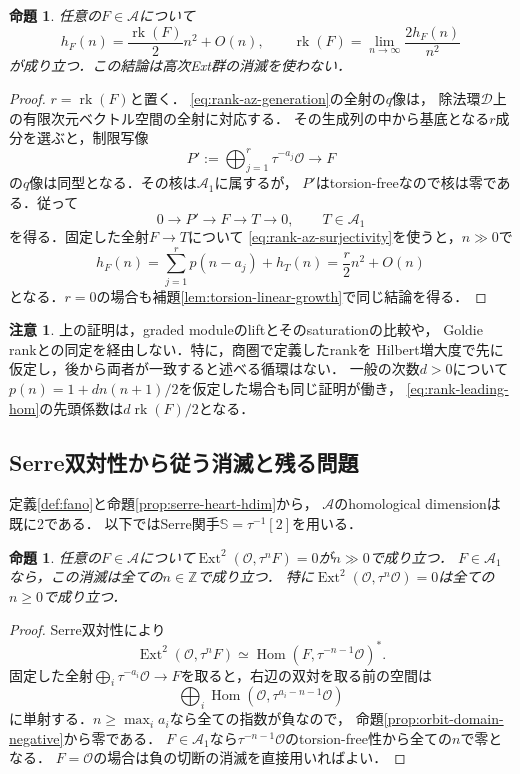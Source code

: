 \documentclass[11pt,a4paper]{ltjsarticle}
\newtheorem{proposition}[theorem]{命題}
\theoremstyle{definition}
\newtheorem{remark}[theorem]{注意}
\newcommand{\OO}{\mathcal O}
\renewcommand{\AA}{\mathcal A}
\newcommand{\SSer}{\mathbb S}
\newcommand{\Hom}{\operatorname{Hom}}
\newcommand{\Ext}{\operatorname{Ext}}
\newcommand{\rk}{\operatorname{rk}}
\begin{document}
\begin{proposition}\label{prop:rank-leading-hom}
任意の$F\in\AA$について
\begin{equation}\label{eq:rank-leading-hom}
 h_F(n)=\frac{\rk(F)}2 n^2+O(n),\qquad
 \rk(F)=\lim_{n\to\infty}\frac{2h_F(n)}{n^2}
\end{equation}
が成り立つ．この結論は高次Ext群の消滅を使わない．
\end{proposition}

\begin{proof}
$r=\rk(F)$と置く．
\eqref{eq:rank-az-generation}の全射の$q$像は，
除法環$\mathcal D$上の有限次元ベクトル空間の全射に対応する．
その生成列の中から基底となる$r$成分を選ぶと，制限写像
\[
 P':=\bigoplus_{j=1}^{r}\tau^{-a_j}\OO\longrightarrow F
\]
の$q$像は同型となる．その核は$\AA_1$に属するが，
$P'$はtorsion-freeなので核は零である．従って
\[
 0\longrightarrow P'\longrightarrow F\longrightarrow T\longrightarrow0,
 \qquad T\in\AA_1
\]
を得る．固定した全射$F\to T$について
\eqref{eq:rank-az-surjectivity}を使うと，$n\gg0$で
\[
 h_F(n)=\sum_{j=1}^{r}p(n-a_j)+h_T(n)
       =\frac r2n^2+O(n)
\]
となる．$r=0$の場合も補題\ref{lem:torsion-linear-growth}で同じ結論を得る．
\end{proof}

\begin{remark}
上の証明は，graded moduleのliftとそのsaturationの比較や，
Goldie rankとの同定を経由しない．特に，商圏で定義したrankを
Hilbert増大度で先に仮定し，後から両者が一致すると述べる循環はない．
一般の次数$d>0$について$p(n)=1+dn(n+1)/2$を仮定した場合も同じ証明が働き，
\eqref{eq:rank-leading-hom}の先頭係数は$d\rk(F)/2$となる．
\end{remark}

\subsection{Serre双対性から従う消滅と残る問題}
定義\ref{def:fano}と命題\ref{prop:serre-heart-hdim}から，
$\AA$のhomological dimensionは既に2である．
以下ではSerre関手$\SSer=\tau^{-1}[2]$を用いる．

\begin{proposition}\label{prop:rank-ext-two-vanishing}
任意の$F\in\AA$について$\Ext^2(\OO,\tau^nF)=0$が$n\gg0$で成り立つ．
$F\in\AA_1$なら，この消滅は全ての$n\in\mathbb Z$で成り立つ．
特に$\Ext^2(\OO,\tau^n\OO)=0$は全ての$n\geq0$で成り立つ．
\end{proposition}

\begin{proof}
Serre双対性により
\[
 \Ext^2(\OO,\tau^nF)
 \simeq\Hom(F,\tau^{-n-1}\OO)^*.
\]
固定した全射$\bigoplus_i\tau^{-a_i}\OO\to F$を取ると，右辺の双対を取る前の空間は
\[
 \bigoplus_i\Hom(\OO,\tau^{a_i-n-1}\OO)
\]
に単射する．$n\geq\max_i a_i$なら全ての指数が負なので，
命題\ref{prop:orbit-domain-negative}から零である．
$F\in\AA_1$なら$\tau^{-n-1}\OO$のtorsion-free性から全ての$n$で零となる．
$F=\OO$の場合は負の切断の消滅を直接用いればよい．
\end{proof}
\end{document}
